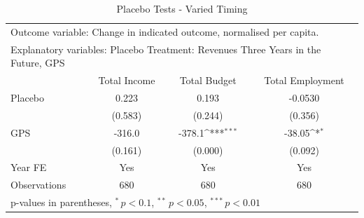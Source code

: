 \begin{table}[htbp]\centering
\def\sym#1{\ifmmode^{#1}\else\(^{#1}\)\fi}
\caption{Placebo Tests - Varied Timing \label{relevantplacebo}}
\begin{tabular*}{\hsize}{@{\hskip\tabcolsep\extracolsep\fill}l*{3}{c}}
\toprule
\multicolumn{4}{l}{\parbox{11cm}{Outcome variable: Change in indicated outcome, normalised per capita. }} \\ \multicolumn{4}{l}{\parbox{11cm}{Explanatory variables: Placebo Treatment: Revenues Three Years in the Future, GPS}} \\ \midrule & Total Income & Total Budget & Total Employment \\ \toprule
\addlinespace Placebo&       0.223         &       0.193         &     -0.0530         \\
            &     (0.583)         &     (0.244)         &     (0.356)         \\\addlinespace
GPS         &      -316.0         &      -378.1\sym{***}&      -38.05\sym{*}  \\
            &     (0.161)         &     (0.000)         &     (0.092)         \\\addlinespace
\midrule
\addlinespace Year FE&         Yes         &         Yes         &         Yes         \\
\addlinespace \midrule \addlinespace Observations&         680         &         680         &         680         \\
\bottomrule
\multicolumn{4}{l}{\footnotesize p-values in parentheses, $^{*}\, p<0.1$, $^{**}\, p<0.05$, $^{***}\, p<0.01$}\\
\end{tabular*}
\end{table}

